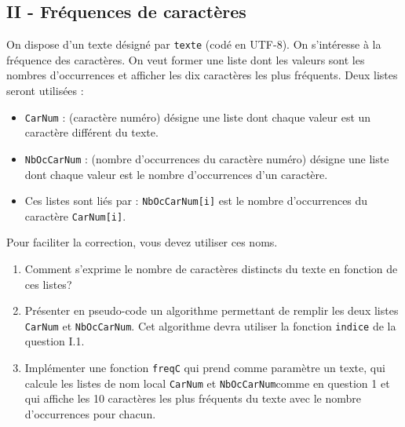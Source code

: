 \subsection*{II - Fréquences de caractères}
On dispose d'un texte désigné par \verb|texte| (codé en UTF-8). On s'intéresse à la fréquence des caractères. On veut former une liste dont les valeurs sont les nombres d'occurrences et afficher les dix caractères les plus fréquents.\newline
Deux listes seront utilisées :
\begin{itemize}
  \item \verb|CarNum| : (caractère numéro) désigne une liste dont chaque valeur est un caractère différent du texte.
  \item \verb|NbOcCarNum| : (nombre d'occurrences du caractère numéro) désigne une liste dont chaque valeur est le nombre d'occurrences d'un caractère.
  \item Ces listes sont liés par : \verb|NbOcCarNum[i]| est le nombre d'occurrences du caractère \verb|CarNum[i]|.
\end{itemize}
Pour faciliter la correction, vous devez utiliser ces noms.
\begin{enumerate}
  \item Comment s'exprime le nombre de caractères distincts du texte en fonction de ces listes?
  \item Présenter en pseudo-code un algorithme permettant de remplir les deux listes \verb|CarNum| et \verb|NbOcCarNum|. Cet algorithme devra utiliser la fonction \verb|indice| de la question I.1.
  \item Implémenter une fonction \verb|freqC| qui prend comme paramètre un texte, qui calcule les listes de nom local \verb|CarNum| et \verb|NbOcCarNum|comme en question 1 et qui affiche les 10 caractères les plus fréquents du texte avec le nombre d'occurrences pour chacun. 
\end{enumerate}

